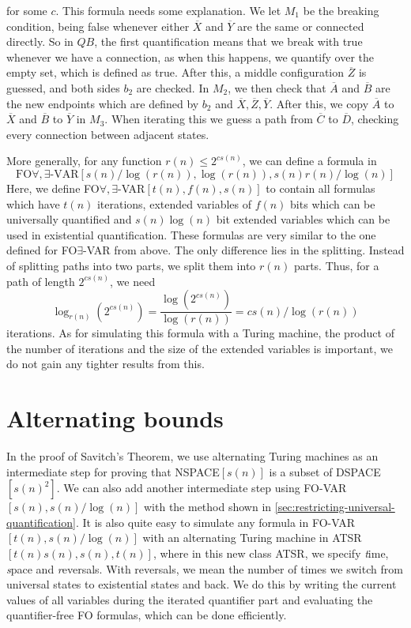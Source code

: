 for some $c$.
This formula needs some explanation.
We let $M_1$ be the breaking condition, being false whenever either $\overline{X}$ and $\overline{Y}$ are the same or connected directly.
So in $QB$, the first quantification means that we break with true whenever we have a connection, as when this happens, we quantify over the empty set, which is defined as true.
After this, a middle configuration $\overline{Z}$ is guessed, and both sides $b_2$ are checked.
In $M_2$, we then check that $\overline{A}$ and $\overline{B}$ are the new endpoints which are defined by $b_2$ and $\overline{X}, \overline{Z}, \overline{Y}$.
After this, we copy $\overline{A}$ to $\overline{X}$ and $\overline{B}$ to $\overline{Y}$ in $M_3$.
When iterating this we guess a path from $\overline{C}$ to $\overline{D}$, checking every connection between adjacent states.

More generally, for any function $r(n) \leq 2^{cs(n)}$, we can define a formula in \[\text{FO$\forall, \exists$-VAR$[s(n)/\log(r(n)), \log(r(n)), s(n)r(n)/\log(n)]$}\]
Here, we define FO$\forall, \exists$-VAR$[t(n), f(n), s(n)]$ to contain all formulas which have $t(n)$ iterations, extended variables of $f(n)$ bits which can be universally quantified and $s(n)\log(n)$ bit extended variables which can be used in existential quantification.
These formulas are very similar to the one defined for FO$\exists$-VAR from above.
The only difference lies in the splitting.
Instead of splitting paths into two parts, we split them into $r(n)$ parts.
Thus, for a path of length $2^{cs(n)}$, we need \[\log_{r(n)}\left(2^{cs(n)}\right) = \frac{\log\left(2^{cs(n)}\right)}{\log(r(n))} = cs(n)/\log(r(n))\] iterations.
As for simulating this formula with a Turing machine, the product of the number of iterations and the size of the extended variables is important, we do not gain any tighter results from this.

\section{Alternating bounds}\label{sec:alternating-bounds}

In the proof of Savitch's Theorem, we use alternating Turing machines as an intermediate step for proving that NSPACE$[s(n)]$ is a subset of DSPACE$[s(n)^2]$.
We can also add another intermediate step using FO-VAR$[s(n), s(n)/\log(n)]$ with the method shown in \cref{sec:restricting-universal-quantification}.
It is also quite easy to simulate any formula in FO-VAR$[t(n), s(n)/\log(n)]$ with an alternating Turing machine in ATSR$[t(n)s(n), s(n), t(n)]$, where in this new class ATSR, we specify \emph{t}ime, \emph{s}pace and \emph{r}eversals.
With reversals, we mean the number of times we switch from universal states to existential states and back.
We do this by writing the current values of all variables during the iterated quantifier part and evaluating the quantifier-free FO formulas, which can be done efficiently.

